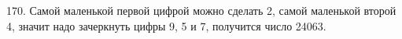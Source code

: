 170. Самой маленькой первой цифрой можно сделать 2, самой маленькой второй 4, значит надо зачеркнуть цифры 9, 5 и 7, получится число 24063.\\
